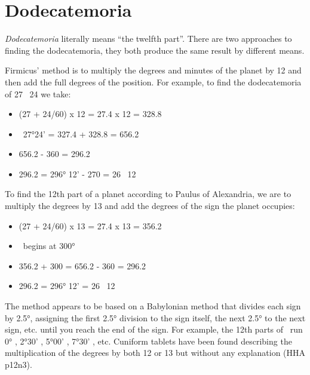 \chapter{Dodecatemoria}
\label{appendix:dodecatemoria}

\textsl{Dodecatemoria} literally means ``the twelfth part''. There are two approaches to finding the dodecatemoria, they both produce the same result by different means\footnotemark[1].


Firmicus' method is to multiply the degrees and minutes of the planet  by 12 and then add the full degrees of the position. For example, to find the dodecatemoria of 27 \Aquarius\, 24 we take:
\begin{itemize}
\item[] (27 + 24/60) x 12 = 27.4 x 12 = 328.8
\item[] \Aquarius\, 27°24' = 327.4 + 328.8 = 656.2
\item[] 656.2 - 360 = 296.2
\item[] 296.2 = 296° 12' - 270 = 26 \Capricorn\, 12
\end{itemize}

To find the 12th part of a planet according to Paulus of Alexandria, we  are to  multiply the degrees by 13 and add the degrees of the sign the planet occupies:
\begin{itemize}
\item[] (27 + 24/60) x 13 = 27.4 x 13 = 356.2
\item[] \Aquarius\, begins at 300°
\item[] 356.2 + 300 = 656.2 - 360 = 296.2
\item[] 296.2 = 296° 12' = 26 \Capricorn\, 12
\end{itemize}

The method appears to be based on a Babylonian method that divides each sign by  2.5°, assigning the first 2.5° division to the sign itself, the next 2.5° to the next sign, etc. until you reach the end of the sign. For example, the 12th parts of \Libra\, run 0° \Libra, 2°30' \Scorpio, 5°00' \Sagittarius, 7°30' \Capricorn, etc.  Cuniform tablets have been found describing the multiplication of the degrees by both 12 or 13 but without any explanation (HHA p12n3). 

